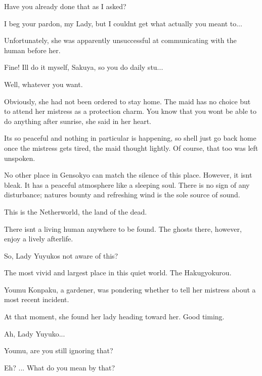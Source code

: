 \begin{tcolorbox}[breakable, colback=white, colframe=black!80,
  boxrule=0.6pt, arc=0mm, left=3mm, right=3mm, top=2mm, bottom=2mm]
\textquotedbl{}Have you already done that as I asked?\textquotedbl{}\par
\textquotedbl{}I beg your pardon, my Lady, but I couldn\textquotesingle{}t get what actually you meant to...\textquotedbl{}\par
Unfortunately, she was apparently unsuccessful at communicating with the human before her.\par
\textquotedbl{}Fine! I\textquotesingle{}ll do it myself, Sakuya, so you do daily stu...\par
Well, whatever you want.\textquotedbl{}\par
Obviously, she had not been ordered to stay home. The maid has no choice but to attend her mistress as a protection charm. \textquotedbl{}You know that you won\textquotesingle{}t be able to do anything after sunrise,\textquotedbl{} she said in her heart.\par
It\textquotesingle{}s so peaceful and nothing in particular is happening, so she\textquotesingle{}ll just go back home once the mistress gets tired, the maid thought lightly. Of course, that too was left unspoken.\par
\medskip
\medskip
No other place in Gensokyo can match the silence of this place. However, it isn\textquotesingle{}t bleak. It has a peaceful atmosphere like a sleeping soul. There is no sign of any disturbance; nature\textquotesingle{}s bounty and refreshing wind is the sole source of sound.\par
This is the Netherworld, the land of the dead.\par
There isn\textquotesingle{}t a living human anywhere to be found. The ghosts there, however, enjoy a lively afterlife.\par
\textquotedbl{}So, Lady Yuyuko\textquotesingle{}s not aware of this?\textquotedbl{}\par
The most vivid and largest place in this quiet world. The Hakugyokurou.\par
Youmu Konpaku, a gardener, was pondering whether to tell her mistress about a most recent incident.\par
At that moment, she found her lady heading toward her. Good timing.\par
\textquotedbl{}Ah, Lady Yuyuko...\textquotedbl{}\par
\textquotedbl{}Youmu, are you still ignoring that?\textquotedbl{}\par
\textquotedbl{}Eh? ... What do you mean by \textquotesingle{}that\textquotesingle{}?\textquotedbl{}\par

\end{tcolorbox}
